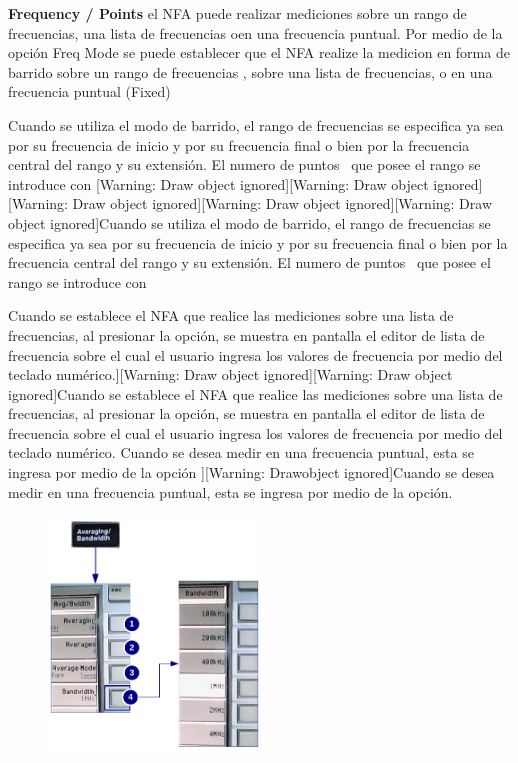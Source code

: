 {\begin{minipage}[t]{\textwidth}
		\textbf{Frequency / Points} el NFA puede realizar mediciones sobre un rango de frecuencias, una lista de frecuencias oen una frecuencia puntual. Por medio de la opción Freq Mode se puede establecer que el NFA realize la medicion en forma	de barrido sobre un rango de frecuencias , sobre una lista de frecuencias, o en una frecuencia puntual (Fixed) 
		
		Cuando se utiliza el modo de barrido, el rango de frecuencias se especifica ya sea por su frecuencia de inicio y por su frecuencia final o bien por la frecuencia central del rango y su extensión. El numero de puntos \ que posee el rango se introduce con [Warning: Draw object ignored][Warning: Draw object ignored][Warning: Draw object ignored][Warning: Draw object ignored][Warning: Draw object ignored]Cuando se utiliza el modo de barrido, el rango de frecuencias se especifica ya sea por su frecuencia de inicio y por su frecuencia final o bien por la frecuencia central del rango y su extensión. El numero de puntos \ que posee el rango se introduce con 
				
		Cuando se establece el NFA que realice las mediciones sobre una lista de frecuencias, al presionar la
		opción, se muestra en pantalla el editor de lista de frecuencia sobre el cual el usuario ingresa los valores de frecuencia por medio del teclado numérico.][Warning: Draw object ignored][Warning: Draw object ignored]Cuando se establece el NFA que realice las mediciones sobre una lista de frecuencias, al presionar la opción, se muestra en pantalla el editor de lista de frecuencia sobre el cual el usuario ingresa los valores de frecuencia por medio del	teclado numérico.
		Cuando se desea medir en una frecuencia puntual, esta se ingresa por medio de la opción ][Warning: Drawobject ignored]Cuando se desea medir en una frecuencia puntual, esta se ingresa por medio de la opción. 		
	\end{minipage}
	
	\begin{minipage}[t]{\textwidth}
		\begin{figure}	
			\centering	
			\includegraphics[width=0.5\textwidth]{Imagenes/MenuAverageBandwidthN8975A.pdf}	
		\end{figure}


\end{minipage}}

